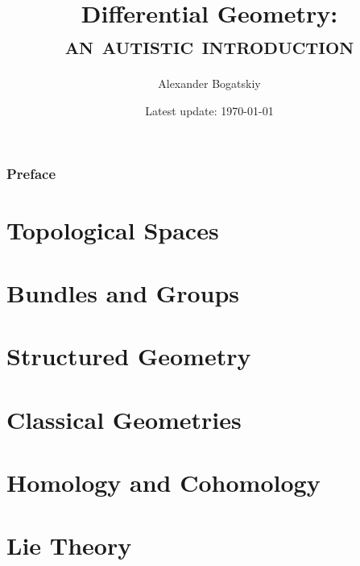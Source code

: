 \documentclass[english,a5paper]{book}%
\begin{document}
\title{
    {\Large{}Differential Geometry:}\\
    \textsc{an autistic introduction}
    }
\author{Alexander Bogatskiy}
\date{Latest update: \today}

\maketitle

\tableofcontents{}

\clearpage
\printglossary[type=\acronymtype,title=Abbreviations,style=long,nonumberlist] %


\clearpage
\section*{Preface}



\part{Topological Spaces}



\clearpage
\part{Bundles and Groups}



\clearpage
\part{Structured Geometry}\label{Part Structured Geom}




\clearpage
\part{Classical Geometries}\label{Part Classical Geom}




\clearpage
\part{Homology and Cohomology}\label{Part II}



\clearpage
\part{Lie Theory \texorpdfstring{\ucmark}{}}\label{part Lie Theory}

\end{document}
